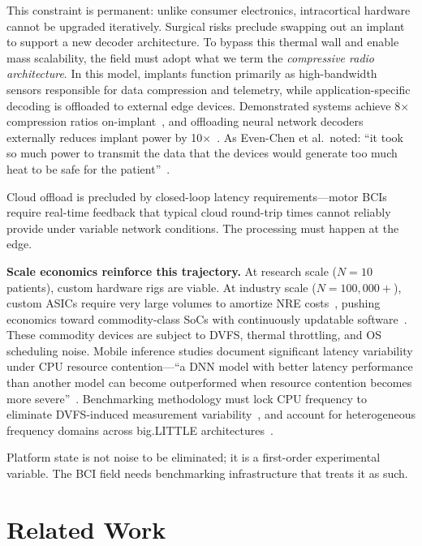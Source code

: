 \documentclass[sigplan,10pt]{acmart}
\begin{document}
This constraint is permanent: unlike consumer electronics, intracortical hardware cannot be upgraded iteratively. Surgical risks preclude swapping out an implant to support a new decoder architecture. To bypass this thermal wall and enable mass scalability, the field must adopt what we term the \emph{compressive radio architecture}. In this model, implants function primarily as high-bandwidth sensors responsible for data compression and telemetry, while application-specific decoding is offloaded to external edge devices. Demonstrated systems achieve 8$\times$ compression ratios on-implant~\cite{liu2016compressed}, and offloading neural network decoders externally reduces implant power by 10$\times$~\cite{evenchen2020power}. As Even-Chen et al.\ noted: ``it took so much power to transmit the data that the devices would generate too much heat to be safe for the patient''~\cite{evenchen2020power}.

Cloud offload is precluded by closed-loop latency requirements---motor BCIs require real-time feedback that typical cloud round-trip times cannot reliably provide under variable network conditions. The processing must happen at the edge.

\textbf{Scale economics reinforce this trajectory.} At research scale ($N=10$ patients), custom hardware rigs are viable. At industry scale ($N=100{,}000+$), custom ASICs require very large volumes to amortize NRE costs~\cite{lankshear2019asic}, pushing economics toward commodity-class SoCs with continuously updatable software~\cite{ttp2025bci}. These commodity devices are subject to DVFS, thermal throttling, and OS scheduling noise. Mobile inference studies document significant latency variability under CPU resource contention---``a DNN model with better latency performance than another model can become outperformed when resource contention becomes more severe''~\cite{yang2020latency}. Benchmarking methodology must lock CPU frequency to eliminate DVFS-induced measurement variability~\cite{willett2019principled}, and account for heterogeneous frequency domains across big.LITTLE architectures~\cite{reddi2022mlperf}.

Platform state is not noise to be eliminated; it is a first-order experimental variable. The BCI field needs benchmarking infrastructure that treats it as such.


\section{Related Work}
\label{sec:related}
\end{document}
